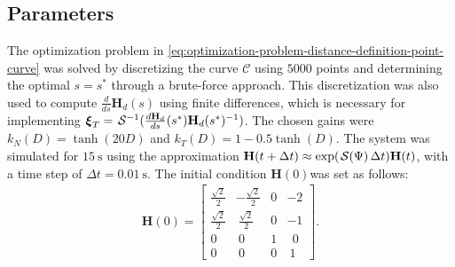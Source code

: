 \subsection{Parameters}
The optimization problem in \eqref{eq:optimization-problem-distance-definition-point-curve} was solved by discretizing the curve $\mathcal{C}$ using $\num{5000}$ points and determining the optimal $s=s^*$ through a brute-force approach. This discretization was also used to compute $\frac{d}{ds}\mathbf{H}_d(s)$ using finite differences, which is necessary for implementing $\boldsymbol{\xi}_T = \SL^{-1}(\frac{d\mathbf{H}_d}{ds}(s^*)\mathbf{H}_d(s^*)^{-1})$. The chosen gains were $k_N(D) = \tanh(20D)$ and $k_T(D) = 1 - 0.5\tanh(D)$. The system was simulated for $\qty{15}{\second}$ using the approximation $\mathbf{H}(t+\Delta t)\approx \exp(\SL[\Psi]\Delta t)\mathbf{H}(t)$, with a time step of $\Delta t=\qty{0.01}{\second}$. The initial condition $\mathbf{H}(0)$was set as follows:
\begin{align}
    \mathbf{H}(0) = \begin{bmatrix}
        \frac{\sqrt{2}}{2} & -\frac{\sqrt{2}}{2} & 0 & -2\\
        \frac{\sqrt{2}}{2} & \ \frac{\sqrt{2}}{2} & 0 & -1\\
        0 & \ 0 & 1 & \ \ 0\\
        0 & \ 0 & 0 & \ 1
    \end{bmatrix}.
\end{align}

